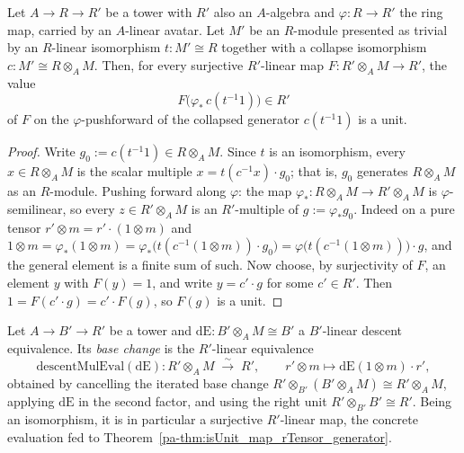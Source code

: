 \begin{theorem}
  \label{pa-thm:isUnit_map_rTensor_generator}
  \leanok

  Let \(A \to R \to R'\) be a tower with \(R'\) also an \(A\)-algebra and \(\varphi \colon R \to
  R'\) the ring map, carried by an \(A\)-linear avatar.  Let \(M'\) be an \(R\)-module presented
  as trivial by an \(R\)-linear isomorphism \(t \colon M' \cong R\) together with a collapse
  isomorphism \(c \colon M' \cong R \otimes_A M\).  Then, for every surjective \(R'\)-linear map
  \(F \colon R' \otimes_A M \to R'\), the value
  \[
    F\bigl(\varphi_{*}\,c(t^{-1} 1)\bigr) \in R'
  \]
  of \(F\) on the \(\varphi\)-pushforward of the collapsed generator \(c(t^{-1} 1)\) is a unit.
\end{theorem}
\begin{proof}
  \leanok
  Write \(g_0 := c(t^{-1} 1) \in R \otimes_A M\).  Since \(t\) is an isomorphism, every \(x \in
  R \otimes_A M\) is the scalar multiple \(x = t(c^{-1} x) \cdot g_0\); that is, \(g_0\)
  generates \(R \otimes_A M\) as an \(R\)-module.  Pushing forward along \(\varphi\): the map
  \(\varphi_{*} \colon R \otimes_A M \to R' \otimes_A M\) is \(\varphi\)-semilinear, so every
  \(z \in R' \otimes_A M\) is an \(R'\)-multiple of \(g := \varphi_{*} g_0\).  Indeed on a pure
  tensor \(r' \otimes m = r' \cdot (1 \otimes m)\) and \(1 \otimes m = \varphi_{*}(1 \otimes m)
  = \varphi_{*}\bigl(t(c^{-1}(1 \otimes m)) \cdot g_0\bigr) = \varphi\bigl(t(c^{-1}(1 \otimes
  m))\bigr) \cdot g\), and the general element is a finite sum of such.  Now choose, by
  surjectivity of \(F\), an element \(y\) with \(F(y) = 1\), and write \(y = c' \cdot g\) for
  some \(c' \in R'\).  Then \(1 = F(c' \cdot g) = c' \cdot F(g)\), so \(F(g)\) is a unit.
\end{proof}

\begin{definition}
  \label{pa-def:descentMulEval}
  \leanok

  Let \(A \to B' \to R'\) be a tower and \(\mathrm{dE} \colon B' \otimes_A M \cong B'\) a
  \(B'\)-linear descent equivalence.  Its \emph{base change} is the \(R'\)-linear equivalence
  \[
    \mathrm{descentMulEval}(\mathrm{dE}) \colon R' \otimes_A M \;\xrightarrow{\ \sim\ }\; R',
    \qquad r' \otimes m \longmapsto \mathrm{dE}(1 \otimes m) \cdot r',
  \]
  obtained by cancelling the iterated base change \(R' \otimes_{B'} (B' \otimes_A M) \cong R'
  \otimes_A M\), applying \(\mathrm{dE}\) in the second factor, and using the right unit \(R'
  \otimes_{B'} B' \cong R'\).  Being an isomorphism, it is in particular a surjective
  \(R'\)-linear map, the concrete evaluation fed to Theorem~\ref{pa-thm:isUnit_map_rTensor_generator}.
\end{definition}

